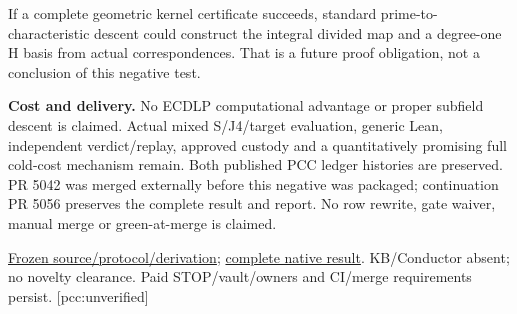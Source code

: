 \documentclass[10pt,a4paper]{article}
\begin{document}
If a complete geometric kernel certificate succeeds, standard
prime-to-characteristic descent could construct the integral divided
map and a degree-one H basis from actual correspondences. That is a
future proof obligation, not a conclusion of this negative test.

\textbf{Cost and delivery.} No ECDLP computational advantage or proper
subfield descent is claimed. Actual mixed S/J4/target evaluation, generic
Lean, independent verdict/replay, approved custody and a quantitatively
promising full cold-cost mechanism remain. Both published PCC ledger
histories are preserved. PR 5042 was merged externally before this negative
was packaged; continuation PR 5056 preserves the complete result and report.
No row rewrite, gate waiver, manual merge or green-at-merge is claimed.

\href{https://github.com/isogeny-labs/crypto/tree/fac647db5d0468c45cd3b635e4723537269c1f51/research/chained_cm19_jacobian_gram_20261123/integral_gluing}{Frozen source/protocol/derivation};
\href{https://github.com/isogeny-labs/crypto/tree/f5b13419565d85aae0f5206f8723e0ad9985a3ae/research/chained_cm19_jacobian_gram_20261123/integral_gluing}{complete native result}.
KB/Conductor absent; no novelty clearance. Paid STOP/vault/owners and
CI/merge requirements persist. [pcc:unverified]
\end{document}
